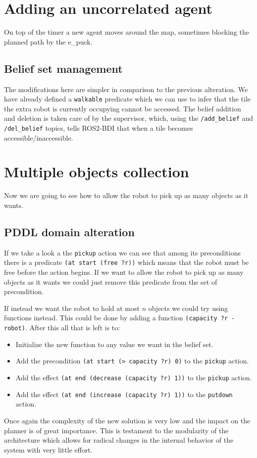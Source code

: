 \section{Adding an uncorrelated agent}
On top of the timer a new agent moves around the map, sometimes blocking the planned path by the e\_puck.

\subsection{Belief set management}
The modifications here are simpler in comparison to the previous alteration. We have already defined a \texttt{walkable} predicate which we can use to infer that the tile the extra robot is currently occupying cannot be accessed. The belief addition and deletion is taken care of by the supervisor, which, using the \texttt{/add\_belief} and \texttt{/del\_belief} topics, tells ROS2-BDI that when a tile becomes accessible/inaccessible.

\section{Multiple objects collection}
Now we are going to see how to allow the robot to pick up as many objects as it wants.

\subsection{PDDL domain alteration} 
If we take a look a the \texttt{pickup} action we can see that among its preconditions there is a predicate \texttt{(at start (free ?r))} which means that the robot must be free before the action begins. If we want to allow the robot to pick up as many objects as it wants we could just remove this predicate from the set of precondition.
\par
If instead we want the robot to hold at most $n$ objects we could try using functions instead. This could be done by adding a function \texttt{(capacity ?r - robot)}. After this all that is left is to:
\begin{itemize}
    \item Initialize the new function to any value we want in the belief set.
    \item Add the precondition \texttt{(at start (> capacity ?r) 0)} to the \texttt{pickup} action.
    \item Add the effect \texttt{(at end (decrease (capacity ?r) 1))} to the \texttt{pickup} action.
    \item Add the effect \texttt{(at end (increase (capacity ?r) 1))} to the \texttt{putdown} action.
\end{itemize}
Once again the complexity of the new solution is very low and the impact on the planner is of great importance. This is testament to the modularity of the architecture which allows for radical changes in the internal behavior of the system with very little effort.

